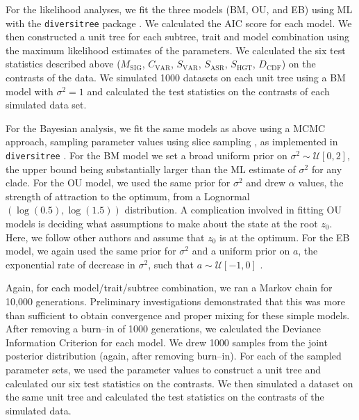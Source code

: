 \documentclass[a4paper,11pt]{article}
\begin{document}
For the likelihood analyses, we fit the three models (BM, OU, and EB) using ML with the \texttt{diversitree} package \citep{FitzJohn2012}. We calculated the AIC score for each model. We then constructed a unit tree for each subtree, trait and model combination using the maximum likelihood estimates of the parameters. We calculated the six test statistics described above ($M_{\text{SIG}}$, $C_{\text{VAR}}$, $S_{\text{VAR}}$, $S_{\text{ASR}}$, $S_{\text{HGT}}$, $D_{\text{CDF}}$) on the contrasts of the data. We simulated 1000 datasets on each unit tree using a BM model with $\sigma^2=1$ and calculated the test statistics on the contrasts of each simulated data set. 

For the Bayesian analysis, we fit the same models as above using a MCMC approach, sampling parameter values using slice sampling \citep{Nealslice}, as implemented in  \texttt{diversitree} \citep{FitzJohn2012}. For the BM model we set a broad uniform prior on $\sigma^2 \sim \mathcal{U}[0, 2]$, the upper bound being substantially larger than the ML estimate of $\sigma^2$ for any clade. For the OU model, we used the same prior for $\sigma^2$ and drew $\alpha$ values, the strength of attraction to the optimum, from a Lognormal$(\log(0.5), \log(1.5))$ distribution. A complication involved in fitting OU models is deciding what assumptions to make about the state at the root $z_0$. Here, we follow other authors \citep{ButlerKing2004, Beaulieu2012} and assume that $z_0$ is at the optimum. For the EB model, we again used the same prior for $\sigma^2$ and a uniform prior on $a$, the exponential rate of decrease in $\sigma^2$, such that $a \sim \mathcal{U}[-1, 0]$ \citep[the minimum value is much less than we would typically expect;][]{SlaterPennell}.

Again, for each model/trait/subtree combination, we ran a Markov chain for 10,000 generations. Preliminary investigations demonstrated that this was more than sufficient to obtain convergence and proper mixing for these simple models. After removing a burn--in of 1000 generations, we calculated the Deviance Information Criterion \citep[DIC, a Bayesian analog of AIC;][]{dic} for each model. We drew 1000 samples from the joint posterior distribution (again, after removing burn--in). For each of the sampled parameter sets, we used the parameter values to construct a unit tree and calculated our six test statistics on the contrasts. We then simulated a dataset on the same unit tree and calculated the test statistics on the contrasts of the simulated data. 
\end{document}
